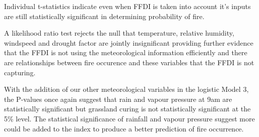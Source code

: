 \documentclass{article}
\begin{document}
Individual t-statistics indicate even when FFDI is taken into account it's inputs are still statistically significant in determining probability of fire. 

A likelihood ratio test rejects the null that temperature, relative humidity, windspeed and drought factor are jointly insignificant providing further evidence that the FFDI is not using the meteorological information efficiently and there are relationships between fire occurence and these variables that the FFDI is not capturing.


With the addition of our other meteorological variables in the logistic Model 3, the P-values once again suggest that rain and vapour pressure at 9am are statistically significant but grassland curing is not statistically significant at the 5\% level. The statistical significance of rainfall and vapour pressure suggest more could be added to the index to produce a better prediction of fire occurrence. 
\end{document}
